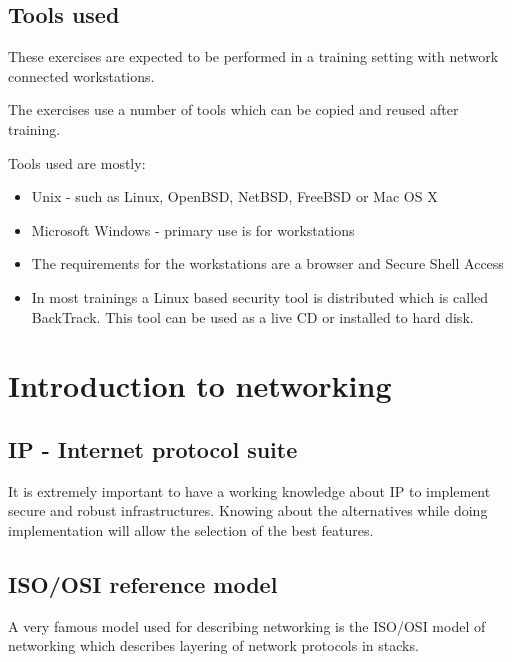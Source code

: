 \documentclass[a4paper,11pt,notitlepage]{report}
\begin{document}
\section*{\color{titlecolor}Tools used}

These exercises are expected to be performed in a training setting with network connected workstations.

The exercises use a number of tools which can be copied and reused after training.

Tools used are mostly:

\begin{itemize}
\item Unix - such as Linux, OpenBSD, NetBSD, FreeBSD or Mac OS X
\item Microsoft Windows - primary use is for workstations
\item The requirements for the workstations are a browser and Secure Shell Access
\item In most trainings a Linux based security tool is distributed which is called BackTrack. This tool can be used as a live CD or installed to hard disk.
\end{itemize}


\rhead{\fancyplain{}{\bf \chaptername\ \thechapter}}


\chapter*{\color{titlecolor}Introduction to networking}
\label{chap:intro}

\section*{\color{titlecolor}IP - Internet protocol suite}

It is extremely important to have a working knowledge about IP to implement
secure and robust infrastructures. Knowing about the alternatives while doing
implementation will allow the selection of the best features.

\section*{\color{titlecolor}ISO/OSI reference model}
A very famous model used for describing networking is the ISO/OSI model
of networking which describes layering of network protocols in stacks.
\end{document}
